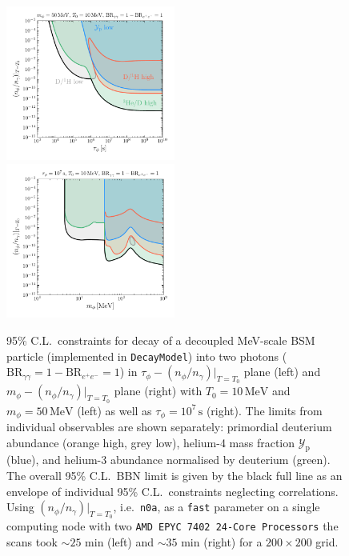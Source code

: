 \documentclass[11pt,a4paper]{article}
\begin{document}
\begin{figure}
	\centering
	\includegraphics[width=0.495\textwidth]{plots/decay_aa_50MeV.pdf}
	\includegraphics[width=0.495\textwidth]{plots/decay_aa_1e7s.pdf}
	\caption{95\% C.L.\ constraints for decay of a decoupled MeV-scale BSM particle (implemented in \texttt{DecayModel}) into two photons ($\text{BR}_{\gamma \gamma} = 1 - \text{BR}_{e^+ e^-} = 1$) in $\tau_\phi - (n_\phi/n_\gamma)|_{T=T_0}$ plane (left) and $m_\phi - (n_\phi/n_\gamma)|_{T=T_0}$ plane (right) with $T_0 = 10 \, \mathrm{MeV}$ and $m_\phi = 50 \, \mathrm{MeV}$ (left) as well as $\tau_\phi = 10^7 \, \mathrm{s}$ (right). The limits from individual observables are shown separately: primordial deuterium abundance (orange high, grey low), helium-4 mass fraction $\mathcal{Y}_\text{p}$ (blue), and helium-3 abundance normalised by deuterium (green). The overall 95\% C.L.\ BBN limit is given by the black full line as an envelope of individual 95\% C.L.\ constraints neglecting correlations. Using $(n_\phi/n_\gamma)|_{T=T_0}$, i.e.\ \texttt{n0a}, as a \texttt{fast} parameter on a single computing node with two \texttt{AMD EPYC 7402 24-Core Processors} the scans took $\sim 25$ min (left) and $\sim 35$ min (right) for a $200 \times 200$ grid.}
	\label{fig:scan_decay}
\end{figure}
\end{document}

